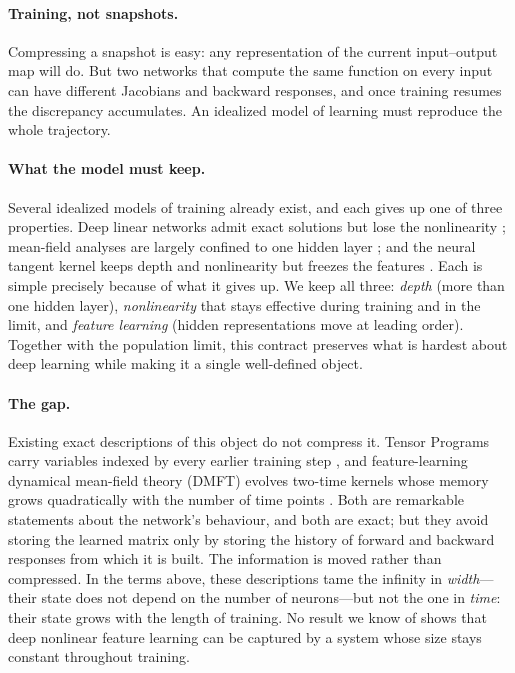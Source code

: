 \documentclass[11pt]{article}
\theoremstyle{definition}
\theoremstyle{remark}
\begin{document}
\paragraph{Training, not snapshots.}
Compressing a snapshot is easy: any representation of the current input--output
map will do.  But two networks that compute the same function on every input can
have different Jacobians and backward responses, and once training resumes the
discrepancy accumulates.  An idealized model of learning must reproduce the whole
trajectory.

\paragraph{What the model must keep.}
Several idealized models of training already exist, and each gives up one of
three properties.  Deep linear networks admit exact solutions but lose the
nonlinearity \citep{saxe2014exact}; mean-field analyses are largely confined to
one hidden layer \citep{chizat2018global,mei2018meanfield,sirignano2019lln}; and
the neural tangent kernel keeps depth and nonlinearity but freezes the features
\citep{jacot2018ntk,lee2019wide,chizat2019lazy}.  Each is simple precisely
because of what it gives up.  We keep all three: \emph{depth} (more than one
hidden layer), \emph{nonlinearity} that stays effective during training and in
the limit, and \emph{feature learning} (hidden representations move at leading
order).  Together with the population limit, this contract preserves what is
hardest about deep learning while making it a single well-defined object.

\paragraph{The gap.}
Existing exact descriptions of this object do not compress it.  Tensor Programs
carry variables indexed by every earlier training step \citep{yang2021tensor},
and feature-learning dynamical mean-field theory (DMFT) evolves two-time kernels
whose memory grows quadratically with the number of time points
\citep{bordelon2022dmft}.  Both are remarkable statements about the network's
behaviour, and both are exact; but they avoid storing the learned matrix only by
storing the history of forward and backward responses from which it is built.
The information is moved rather than compressed.  In the terms above, these
descriptions tame the infinity in \emph{width}---their state does not depend on
the number of neurons---but not the one in \emph{time}: their state grows with
the length of training.
No result we know of shows that deep nonlinear feature learning can be captured
by a system whose size stays constant throughout training.
\end{document}
